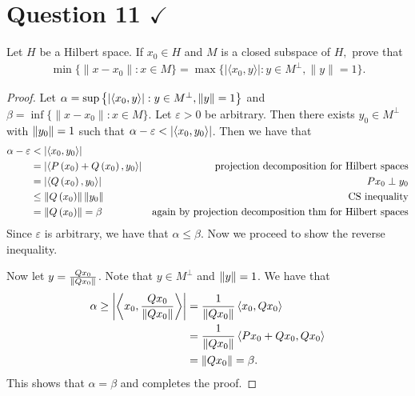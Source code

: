 \section{Question 11 \texorpdfstring{$\checkmark$}{}}

\horz
Let $H$ be a Hilbert space. If $x_0\in H$ and $M$ is a closed subspace of $H,$ prove that
\begin{align*}
\min \{\|x-x_0\| : x\in M\} = \max \{ |\langle x_0,y\rangle | : y\in M^{\perp},\|y\|=1\}.
\end{align*}
\horz
\begin{proof}
    Let $\alpha = \sup\left\{ \left\lvert \left\langle x_{0},y \right\rangle \right\rvert : y \in M^{\perp}, \left\lVert y \right\rVert=1 \right\}$ and $\beta = \inf \{\|x-x_0\| : x\in M\} $. Let $\varepsilon > 0$ be arbitrary. Then there exists $y_{0} \in M^{\perp}$ with $\left\lVert y_{0} \right\rVert=1$ such that $\alpha - \varepsilon < \left\lvert \left\langle x_{0}, y_{0} \right\rangle \right\rvert$. Then we have that
    \begin{align*}
	\alpha - \varepsilon &< \left\lvert \left\langle x_{0}, y_{0} \right\rangle \right\rvert \\
	&= \left\lvert \left\langle P\left( x_{0} \right) + Q \left( x_{0} \right), y_{0} \right\rangle \right\rvert & \text{projection decomposition for Hilbert spaces} \\
	&= \left\lvert \left\langle Q \left( x_{0} \right), y_{0} \right\rangle \right\rvert & Px_{0} \perp y_{0} \\
	&\le \left\lVert Q \left( x_{0} \right) \right\rVert \left\lVert y_{0} \right\rVert & \text{CS inequality} \\
	&= \left\lVert Q \left( x_{0} \right) \right\rVert =\beta & \text{again by projection decomposition thm for Hilbert spaces}
    \end{align*}
    Since $\varepsilon$ is arbitrary, we have that $\alpha \le \beta$. Now we proceed to show the reverse inequality.

    Now let $y=\frac{Qx_{0}}{\left\lVert Qx_{0} \right\rVert}$. Note that $y\in M^{\perp}$ and $\left\lVert y \right\rVert =1$. We have that
    \begin{align*}
	\alpha \ge \left\lvert \left\langle x_{0}, \frac{Qx_{0}}{\left\lVert Qx_{0} \right\rVert} \right\rangle \right\rvert &= \frac{1}{\left\lVert Qx_{0} \right\rVert} \left\langle x_{0}, Qx_{0} \right\rangle \\
	&= \frac{1}{\left\lVert Qx_{0} \right\rVert} \left\langle Px_{0} + Qx_{0} , Qx_{0} \right\rangle \\
	&= \left\lVert Qx_{0} \right\rVert = \beta \text{.}
    \end{align*}
    This shows that $\alpha = \beta$ and completes the proof.
\end{proof}
